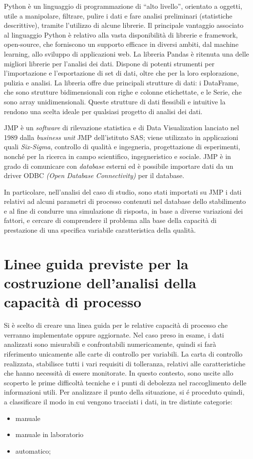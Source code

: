 Python è un linguaggio di programmazione di ``alto livello'', orientato a oggetti, utile a manipolare, filtrare, pulire i dati e fare analisi preliminari (statistiche descrittive), tramite l'utilizzo di alcune librerie. 
Il principale vantaggio associato al linguaggio Python è relativo alla vasta disponibilità di librerie e framework, open-source, che forniscono un supporto efficace in diversi ambiti, dal
machine learning, allo sviluppo di applicazioni web.
La libreria Pandas è ritenuta una delle migliori librerie per l'analisi dei dati. Dispone di potenti strumenti per l'importazione e l'esportazione di set di dati, oltre che per la loro esplorazione, pulizia e analisi. La libreria offre due principali strutture di dati: i DataFrame, che sono strutture bidimensionali con righe e colonne etichettate, e le Serie, che sono array unidimensionali. Queste strutture di dati flessibili e intuitive la rendono una scelta ideale per qualsiasi progetto di analisi dei dati.
\cite{Python}
\cite{PythonPandas}


JMP è un \textit{software} di rilevazione statistica e di Data Visualization lanciato nel 1989 dalla \textit{business unit} JMP dell'istituto SAS;
viene utilizzato in applicazioni quali \textit{Six-Sigma}, controllo di qualità e ingegneria, progettazione di esperimenti, nonché per la ricerca in campo scientifico, ingegneristico e sociale.
JMP è in grado di comunicare con \textit{database} esterni ed è possibile importare dati da un driver ODBC \textit{(Open Database Connectivity)} per il database. 
\cite{WikipediaJMP}


In particolare, nell'analisi del caso di studio, sono stati importati su JMP i dati relativi ad alcuni parametri di processo contenuti nel database dello stabilimento e al fine di condurre una simulazione di risposta, in base a diverse variazioni dei fattori, e cercare di comprendere il problema alla base della capacità di prestazione di una specifica variabile caratteristica della qualità.


\section{Linee guida previste per la costruzione dell'analisi della capacità di processo}
Si è scelto di creare una linea guida per le relative capacità di processo che verranno implementate oppure aggiornate. 
Nel caso preso in esame, i dati analizzati sono misurabili e confrontabili numericamente, quindi si farà riferimento unicamente alle carte di controllo per variabili.
La carta di controllo realizzata, stabilisce tutti i vari requisiti di tolleranza, relativi alle caratteristiche che hanno necessità di essere monitorate.
In questo contesto, sono uscite allo scoperto le prime difficoltà tecniche e i punti di debolezza nel raccoglimento delle informazioni utili.
Per analizzare il punto della situazione, si é proceduto quindi, a classificare il modo in cui vengono tracciati i dati, in tre distinte categorie:
\begin{itemize}
	\item manuale
	\item manuale in laboratorio
	\item automatico;
\end{itemize}

